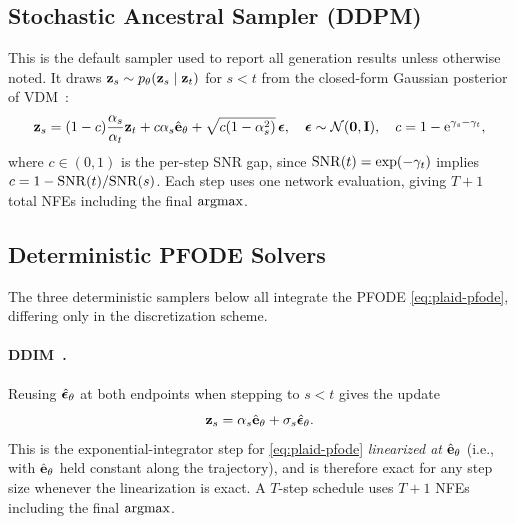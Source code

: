 \documentclass{article}
\begin{document}
\subsection{Stochastic Ancestral Sampler (DDPM)}
\label{app:sampler-ddpm}

This is the default sampler used to report all generation results unless otherwise noted. It draws ${\mathbf z}_s \sim p_\theta({\mathbf z}_s \mid {\mathbf z}_t)$ for $s < t$ from the closed-form Gaussian posterior of VDM~\citep[App.~A.4]{kingma2021variational}:
\begin{equation}\label{eq:plaid-ancestral}
{\mathbf z}_s = (1 - c) \frac{\alpha_s}{\alpha_t} {\mathbf z}_t + c \alpha_s \hat{{\mathbf e}}_\theta + \sqrt{c (1 - \alpha_s^2)}\,{\boldsymbol{\epsilon}}, \quad {\boldsymbol{\epsilon}} \sim \mathcal{N}({\mathbf 0}, {\mathbf I}), \quad c = 1 - {\mathrm{e}}^{\gamma_s - \gamma_t},
\end{equation}
where $c \in (0, 1)$ is the per-step SNR gap, since ${\mathrm{SNR}}(t) = \exp(-\gamma_t)$ implies $c = 1 - {\mathrm{SNR}}(t)/{\mathrm{SNR}}(s)$. Each step uses one network evaluation, giving $T + 1$ total NFEs including the final $\operatorname*{argmax}$.

\subsection{Deterministic PFODE Solvers}
\label{app:sampler-pfode}

The three deterministic samplers below all integrate the PFODE \cref{eq:plaid-pfode}, differing only in the discretization scheme.

\paragraph{DDIM~\citep{song2021denoising}.} Reusing $\hat{{\boldsymbol{\epsilon}}}_\theta$ at both endpoints when stepping to $s < t$ gives the update
\begin{equation}\label{eq:plaid-ddim}
  {\mathbf z}_s = \alpha_s \hat{{\mathbf e}}_\theta + \sigma_s \hat{{\boldsymbol{\epsilon}}}_\theta.
\end{equation}
This is the exponential-integrator step for \cref{eq:plaid-pfode} \emph{linearized at $\hat{{\mathbf e}}_\theta$} (i.e., with $\hat{{\mathbf e}}_\theta$ held constant along the trajectory), and is therefore exact for any step size whenever the linearization is exact. A $T$-step schedule uses $T + 1$ NFEs including the final $\operatorname*{argmax}$.
\end{document}

